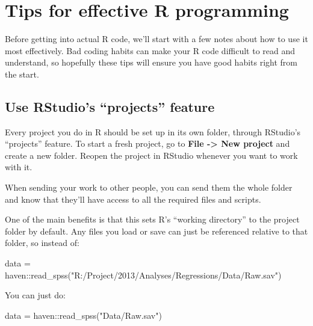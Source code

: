\documentclass[
]{book}
\newenvironment{Shaded}{\begin{snugshade}}{\end{snugshade}}
\newcommand{\FunctionTok}[1]{\textcolor[rgb]{0.00,0.00,0.00}{#1}}
\newcommand{\NormalTok}[1]{#1}
\newcommand{\OtherTok}[1]{\textcolor[rgb]{0.56,0.35,0.01}{#1}}
\newcommand{\SpecialCharTok}[1]{\textcolor[rgb]{0.00,0.00,0.00}{#1}}
\newcommand{\StringTok}[1]{\textcolor[rgb]{0.31,0.60,0.02}{#1}}
\begin{document}
\hypertarget{tips-for-effective-r-programming}{%
\chapter{Tips for effective R programming}\label{tips-for-effective-r-programming}}

Before getting into actual R code, we'll start with a few notes
about how to use it most effectively. Bad coding habits can
make your R code difficult to read and understand, so hopefully
these tips will ensure you have good habits right from the start.

\hypertarget{use-rstudios-projects-feature}{%
\section{Use RStudio's ``projects'' feature}\label{use-rstudios-projects-feature}}

Every project you do in R should be set up in its own folder, through
RStudio's ``projects'' feature. To start a fresh project, go to
\textbf{File -\textgreater{} New project} and create a new folder. Reopen the project
in RStudio whenever you want to work with it.

When sending your work to other people, you can send them the whole
folder and know that they'll have access to all the required files and
scripts.

One of the main benefits is that this sets R's ``working directory'' to
the project folder by default. Any files you load or save can
just be referenced relative to that folder, so instead of:

\begin{Shaded}
\begin{Highlighting}[]
\NormalTok{data }\OtherTok{=}\NormalTok{ haven}\SpecialCharTok{::}\FunctionTok{read\_spss}\NormalTok{(}\StringTok{"R:/Project/2013/Analyses/Regressions/Data/Raw.sav"}\NormalTok{)}
\end{Highlighting}
\end{Shaded}

You can just do:

\begin{Shaded}
\begin{Highlighting}[]
\NormalTok{data }\OtherTok{=}\NormalTok{ haven}\SpecialCharTok{::}\FunctionTok{read\_spss}\NormalTok{(}\StringTok{"Data/Raw.sav"}\NormalTok{)}
\end{Highlighting}
\end{Shaded}
\end{document}
